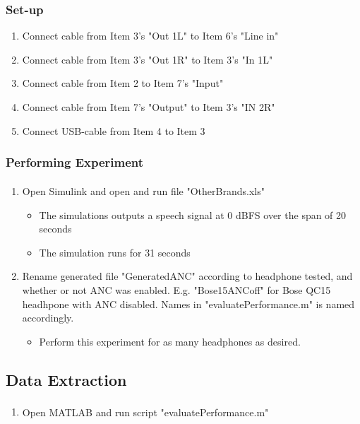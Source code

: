	\subsubsection{Set-up}
	\begin{enumerate}
		\item Connect cable from Item 3's "Out 1L" to Item 6's "Line in"
		\item Connect cable from Item 3's "Out 1R" to Item 3's "In 1L"
		\item Connect cable from Item 2 to Item 7's "Input"
		\item Connect cable from Item 7's "Output" to Item 3's "IN 2R"
		\item Connect USB-cable from Item 4 to Item 3
	\end{enumerate}

	\subsubsection{Performing Experiment}
	\begin{enumerate}
		\item Open Simulink\textsuperscript{\textregistered} and open and run file "OtherBrands.xls"
		\begin{itemize} 
			\item The simulations outputs a speech signal at 0 dBFS over the span of 20 seconds
			\item The simulation runs for 31 seconds
		\end{itemize}
		\item Rename generated file "GeneratedANC" according to headphone tested, and whether or not ANC was enabled. E.g. "Bose15ANCoff" for Bose QC15 headhpone with ANC disabled. Names in "evaluatePerformance.m" is named accordingly.
				\begin{itemize}
			\item[] Perform this experiment for as many headphones as desired.
		\end{itemize}
	\end{enumerate}
	
		
\subsection{Data Extraction}
\begin{enumerate}
	\item Open MATLAB\textsuperscript{\textregistered} and run script "evaluatePerformance.m"
\end{enumerate}

